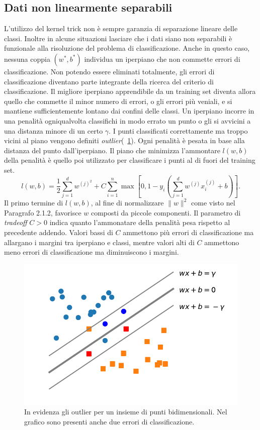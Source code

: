 \documentclass [11pt,a4paper,twoside,openright] {book}
\begin{document}
\subsection{Dati non linearmente separabili}
L'utilizzo del kernel trick non è sempre garanzia di separazione lineare delle classi. Inoltre in alcune situazioni lasciare che i dati siano non separabili è funzionale alla risoluzione del problema di classificazione. Anche in questo caso, nessuna coppia $(w^*,b^*)$ individua un iperpiano che non commette errori di classificazione. Non potendo essere eliminati totalmente, gli errori di classificazione diventano parte integrante della ricerca del criterio di classificazione. Il migliore iperpiano apprendibile da un training set diventa allora quello che commette il minor numero di errori, o gli errori più veniali, e si mantiene sufficientemente lontano dai confini delle classi. Un iperpiano incorre in una penalità ogniqualvolta classifichi in modo errato un punto o gli si avvicini a una distanza minore di un certo $\gamma$. I punti classificati correttamente ma troppo vicini al piano vengono definiti \textit{outlier}(\figurename~\ref{outliers}). Ogni penalità è pesata in base alla distanza del punto dall'iperpiano. Il piano che minimizza l'ammontare $l(w,b)$ della penalità è quello poi utilizzato per classificare i punti al di fuori del training set.
\begin{equation}
l(w,b)= \dfrac{1}{2} \sum_{j=1}^d w^{(j)^2} + C \sum_{i=1}^n \max[0, 1 - y_i(\sum_{j=1}^d w^{(j)} x_i^{(j)} + b)].
\end{equation}
Il primo termine di $l(w,b)$, al fine di normalizzare $\parallel w \parallel ^2$ come visto nel Paragrafo 2.1.2, favorisce $w$ composti da piccole componenti. Il parametro di \textit{tradeoff} $C > 0$ indica quanto l'ammonatare della penalità pesa rispetto al precedente addendo. Valori bassi di $C$ ammettono più errori di classificazione ma allargano i margini tra iperpiano e classi, mentre valori alti di $C$ ammettono meno errori di classificazione ma diminuiscono i margini.
\begin{figure}[H]
\centering
\includegraphics[scale=.7]{figure/outliers.pdf}
\caption{In evidenza gli outlier per un insieme di punti bidimensionali. Nel grafico sono presenti anche due errori di classificazione. \label{outliers}}
\end{figure}
\end{document}
